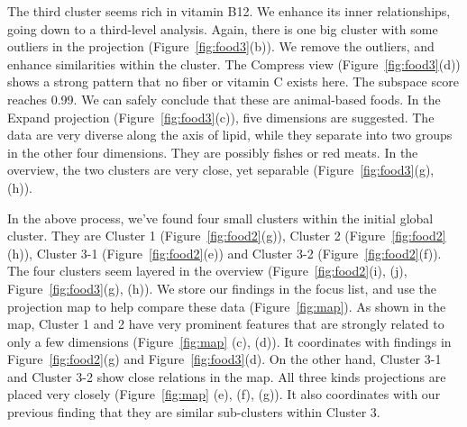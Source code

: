 {The third cluster seems rich in vitamin B12. We enhance its inner relationships, going down to a third-level analysis. Again, there is one big cluster with some outliers in the projection (Figure~\ref{fig:food3}(b)). We remove the outliers, and enhance similarities within the cluster. The Compress view (Figure~\ref{fig:food3}(d)) shows a strong pattern that no fiber or vitamin C exists here. The subspace score reaches 0.99. We can safely conclude that these are animal-based foods. In the Expand projection (Figure~\ref{fig:food3}(c)), five dimensions are suggested. The data are very diverse along the axis of lipid, while they separate into two groups in the other four dimensions. They are possibly fishes or red meats. In the overview, the two clusters are very close, yet separable (Figure~\ref{fig:food3}(g), (h)).

In the above process, we've found four small clusters within the initial global cluster. They are Cluster 1 (Figure~\ref{fig:food2}(g)), Cluster 2 (Figure~\ref{fig:food2}(h)), Cluster 3-1 (Figure~\ref{fig:food2}(e)) and Cluster 3-2 (Figure~\ref{fig:food2}(f)). The four clusters seem layered in the overview (Figure~\ref{fig:food2}(i), (j), Figure~\ref{fig:food3}(g), (h)). We store our findings in the focus list, and use the projection map to help compare these data (Figure~\ref{fig:map}). As shown in the map, Cluster 1 and 2 have very prominent features that are strongly related to only a few dimensions (Figure~\ref{fig:map} (c), (d)). It coordinates with findings in Figure~\ref{fig:food2}(g) and Figure~\ref{fig:food3}(d). On the other hand, Cluster 3-1 and Cluster 3-2 show close relations in the map. All three kinds projections are placed very closely (Figure~\ref{fig:map} (e), (f), (g)). It also coordinates with our previous finding that they are similar sub-clusters within Cluster 3.
}


